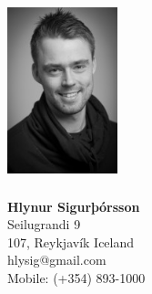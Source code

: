 \documentclass[margin]{res}
\begin{document}
\begin{figure}
\begin{minipage}[b]{0.45\linewidth}
\section {\includegraphics[height=4.8cm]{hlysig_profile}}
\end{minipage}
\hspace{0.5cm}
\begin{minipage}[b]{0.45\linewidth}
{\large\bf Hlynur Sigurþórsson}\\
 Seilugrandi 9\\
 107, Reykjavík Iceland\\
 hlysig@gmail.com\\
 Mobile: (+354) 893-1000\\
\end{minipage}
\end{figure}
\end{document}
